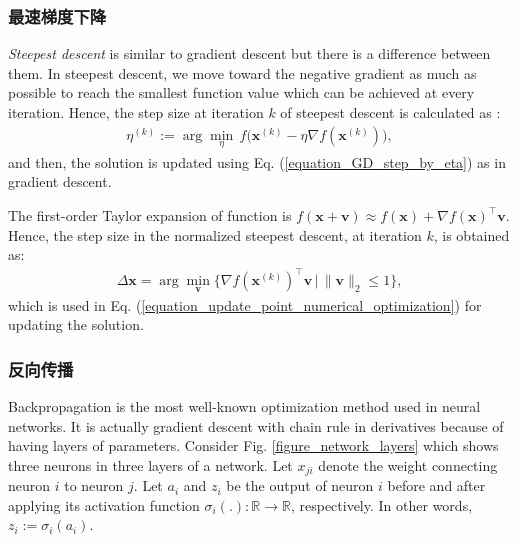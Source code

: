 \documentclass[lang=cn,10pt]{gorgeousnbook}
\numberwithin{equation}{section}%
\numberwithin{figure}{section}%
\begin{document}
\subsubsection{最速梯度下降}


\textit{Steepest descent} is similar to gradient descent but there is a difference between them. In steepest descent, we move toward the negative gradient as much as possible to reach the smallest function value which can be achieved at every iteration. Hence, the step size at iteration $k$ of steepest descent is calculated as \cite{chong2004introduction}:
\begin{align}\label{equation_steepest_descent_update}
\eta^{(k)} := \arg\min_{\eta}\, f\big(\boldsymbol{x}^{(k)} - \eta \nabla f(\boldsymbol{x}^{(k)})\big),
\end{align}
and then, the solution is updated using Eq. (\ref{equation_GD_step_by_eta}) as in gradient descent. 

The first-order Taylor expansion of function is $f(\boldsymbol{x} + \boldsymbol{v}) \approx f(\boldsymbol{x}) + \nabla f(\boldsymbol{x})^\top \boldsymbol{v}$. Hence, the step size in the normalized steepest descent, at iteration $k$, is obtained as:
\begin{align}
\Delta \boldsymbol{x} = \arg\min_{\boldsymbol{v}}\{\nabla f(\boldsymbol{x}^{(k)})^\top \boldsymbol{v}\,|\, \|\boldsymbol{v}\|_2 \leq 1\},
\end{align}
which is used in Eq. (\ref{equation_update_point_numerical_optimization}) for updating the solution.

\subsubsection{反向传播}\label{section_backpropagation}

Backpropagation \cite{rumelhart1986learning} is the most well-known optimization method used in neural networks. It is actually gradient descent with chain rule in derivatives because of having layers of parameters. 
Consider Fig. \ref{figure_network_layers} which shows three neurons in three layers of a network. 
Let $x_{ji}$ denote the weight connecting neuron $i$ to neuron $j$. Let $a_i$ and $z_i$ be the output of neuron $i$ before and after applying its activation function $\sigma_i(.): \mathbb{R} \rightarrow \mathbb{R}$, respectively. In other words, $z_i := \sigma_i(a_i)$.
\end{document}
